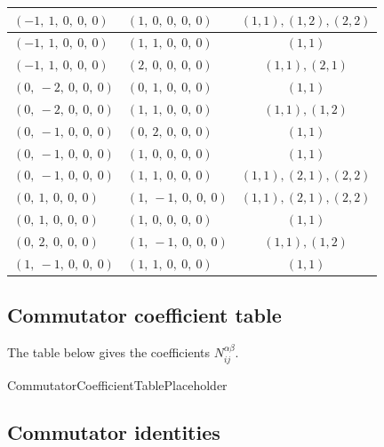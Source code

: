 \documentclass[11pt]{article}
\newcommand{\noi}{\noindent}
\theoremstyle{definition}
\begin{document}
\begin{tabular}{|l|l|c|}
    \hline
    $\left( -1, \  1, \  0, \  0, \  0\right)$ & $\left( 1, \  0, \  0, \  0, \  0\right)$ & $(1,1), (1,2), (2,2)$ \\
    \hline
    $\left( -1, \  1, \  0, \  0, \  0\right)$ & $\left( 1, \  1, \  0, \  0, \  0\right)$ & $(1,1)$ \\
    \hline
    $\left( -1, \  1, \  0, \  0, \  0\right)$ & $\left( 2, \  0, \  0, \  0, \  0\right)$ & $(1,1), (2,1)$ \\
    \hline
    $\left( 0, \  -2, \  0, \  0, \  0\right)$ & $\left( 0, \  1, \  0, \  0, \  0\right)$ & $(1,1)$ \\
    \hline
    $\left( 0, \  -2, \  0, \  0, \  0\right)$ & $\left( 1, \  1, \  0, \  0, \  0\right)$ & $(1,1), (1,2)$ \\
    \hline
    $\left( 0, \  -1, \  0, \  0, \  0\right)$ & $\left( 0, \  2, \  0, \  0, \  0\right)$ & $(1,1)$ \\
    \hline
    $\left( 0, \  -1, \  0, \  0, \  0\right)$ & $\left( 1, \  0, \  0, \  0, \  0\right)$ & $(1,1)$ \\
    \hline
    $\left( 0, \  -1, \  0, \  0, \  0\right)$ & $\left( 1, \  1, \  0, \  0, \  0\right)$ & $(1,1), (2,1), (2,2)$ \\
    \hline
    $\left( 0, \  1, \  0, \  0, \  0\right)$ & $\left( 1, \  -1, \  0, \  0, \  0\right)$ & $(1,1), (2,1), (2,2)$ \\
    \hline
    $\left( 0, \  1, \  0, \  0, \  0\right)$ & $\left( 1, \  0, \  0, \  0, \  0\right)$ & $(1,1)$ \\
    \hline
    $\left( 0, \  2, \  0, \  0, \  0\right)$ & $\left( 1, \  -1, \  0, \  0, \  0\right)$ & $(1,1), (1,2)$ \\
    \hline
    $\left( 1, \  -1, \  0, \  0, \  0\right)$ & $\left( 1, \  1, \  0, \  0, \  0\right)$ & $(1,1)$ \\
    \hline
\end{tabular}


\subsection{Commutator coefficient table}

\noi The table below gives the coefficients $N_{ij}^{\alpha\beta}$.

CommutatorCoefficientTablePlaceholder

\subsection{Commutator identities}
\end{document}
